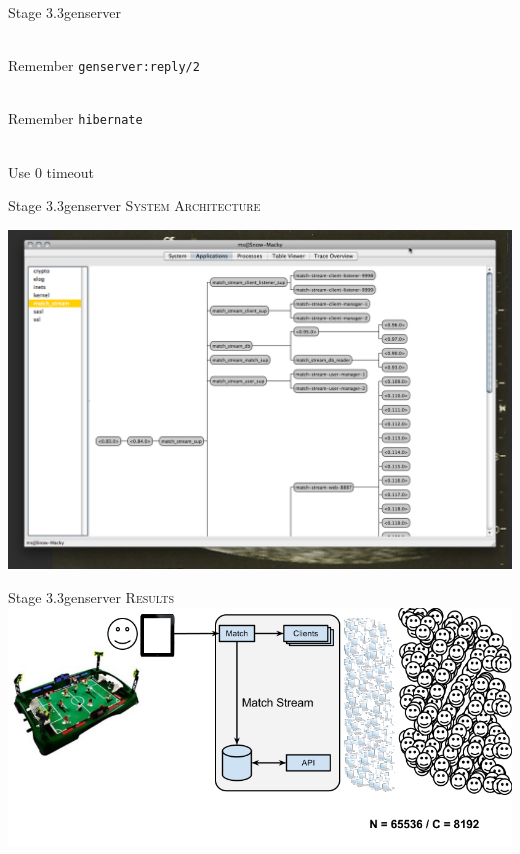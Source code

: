 \documentclass[utf8]{beamer}
\begin{document}
\begin{frame}{Stage 3.3}{gen\textunderscore server}
	\begin{description}
		\item<+->[Call Timeouts]\ \\
			Remember \texttt{gen\textunderscore server:reply/2}
		\item<+->[Memory Footprint]\ \\
			Remember \texttt{hibernate}
		\item<+->[Long \texttt{init/1}]\ \\
			Use $0$ timeout
	\end{description}
\end{frame}
\begin{frame}{Stage 3.3}{gen\textunderscore server}
	\textsc{System Architecture}
	\begin{center}
		\includegraphics[height=.75\textheight]{img/running-late.png}
	\end{center}
\end{frame}
\begin{frame}{Stage 3.3}{gen\textunderscore server}
	\textsc{Results}
	\includegraphics[top=-1,width=\textwidth]{img/MatchStream-3.png}
\end{frame}
\end{document}
